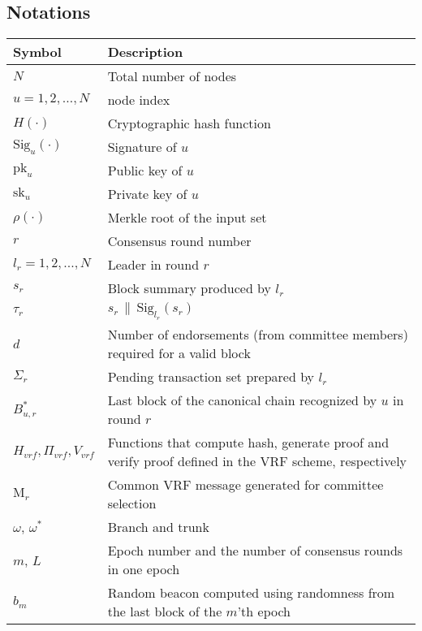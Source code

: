 \documentclass{article}
\begin{document}
\subsection{Notations}
\renewcommand{\arraystretch}{2}
\begin{longtable}{p{3cm} p{10cm}}
    Symbol  & Description \\
    \hline\hline
    $N$ & Total number of nodes \\
    \hline
    $u=1,2,\dots,N$ & node index \\
    \hline
    $H(\cdot)$ & Cryptographic hash function \\
    \hline
    $\textrm{Sig}_u(\cdot)$ & Signature of $u$ \\
    \hline
    $\textrm{pk}_u$ & Public key of $u$ \\
    \hline
    $\textrm{sk}_u$ & Private key of $u$ \\
    \hline
    $\rho\left(\cdot\right)$ & Merkle root of the input set\\
    \hline\hline
    $r$ & Consensus round number \\
    \hline
    $l_r=1,2,...,N$ & Leader in round $r$ \\
    \hline
    $s_r$ & Block summary produced by $l_r$ \\
    \hline
    $\tau_r$ & $s_r\,\|\,\textrm{Sig}_{l_r}(s_r)$ \\
    \hline
    $d$ & Number of endorsements (from committee members) required for a valid block \\
    \hline
    $\Sigma_r$ & Pending transaction set prepared by $l_r$ \\
    \hline
    $B_{u,r}^*$ & Last block of the canonical chain recognized by $u$ in round $r$\\ 
    \hline
    $H_{vrf},\Pi_{vrf},V_{vrf}$ & Functions that compute hash, generate proof and verify proof defined in the VRF scheme, respectively \\
    \hline
    $\textrm{M}_r$ & Common VRF message generated for committee selection \\
    \hline
    $\omega$, $\omega^*$ & Branch and trunk \\
    \hline
    $m$, $L$ & Epoch number and the number of consensus rounds in one epoch \\
    \hline
    $b_m$ & Random beacon computed using randomness from the last block of the $m$'th epoch \\
    \hline
\end{longtable}
\end{document}
